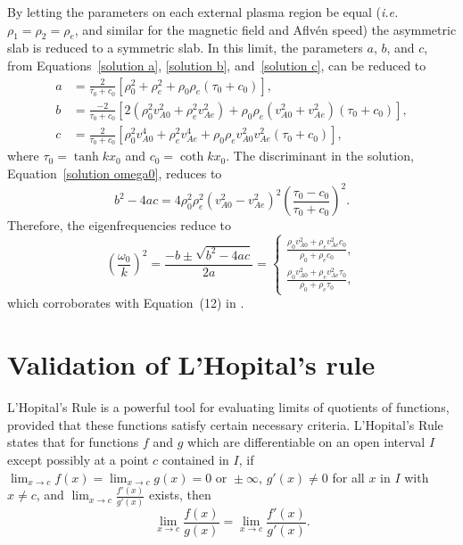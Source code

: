 \documentclass{aastex61}
\begin{document}
By letting the parameters on each external plasma region be equal (\textit{i.e.} $\rho_1 = \rho_2 = \rho_e$, and similar for the magnetic field and Aflv\'{e}n speed) the asymmetric slab is reduced to a symmetric slab. In this limit, the parameters $a$, $b$, and $c$, from Equations~\eqref{solution a}, \eqref{solution b}, and~\eqref{solution c}, can be reduced to
\begin{align}
a &= \frac{2}{\tau_0 + c_0} \left[ \rho_0^2 + \rho_e^2 + \rho_0\rho_e(\tau_0 + c_0) \right], \\
b &= \frac{-2}{\tau_0 + c_0} \left[ 2(\rho_0^2v_{A0}^2 + \rho_e^2v_{Ae}^2) + \rho_0\rho_e(v_{A0}^2 + v_{Ae}^2)(\tau_0 + c_0) \right], \\
c &= \frac{2}{\tau_0 + c_0} \left[ \rho_0^2v_{A0}^4 + \rho_e^2v_{Ae}^4 + \rho_0\rho_ev_{A0}^2v_{Ae}^2(\tau_0 + c_0) \right],
\end{align}
where $\tau_0 = \tanh{kx_0}$ and $c_0 = \coth{kx_0}$. The discriminant in the solution, Equation~\eqref{solution omega0}, reduces to
\begin{equation}
b^2 - 4ac = 4\rho_0^2\rho_e^2(v_{A0}^2 - v_{Ae}^2)^2 \left(\frac{\tau_0 - c_0}{\tau_0 + c_0}\right)^2. 
\end{equation}
Therefore, the eigenfrequencies reduce to
\begin{equation}
\left(\frac{\omega_0}{k}\right)^2 = \frac{-b \pm \sqrt{b^2 - 4ac}}{2a} =
\begin{cases}
\frac{\rho_0v_{A0}^2 + \rho_ev_{Ae}^2c_0}{\rho_0 + \rho_ec_0}, \\
\frac{\rho_0v_{A0}^2 + \rho_ev_{Ae}^2\tau_0}{\rho_0 + \rho_e\tau_0},
\end{cases}
\end{equation}
which corroborates with Equation~(12) in \cite{rob81b}.


\section{Validation of L'Hopital's rule} \label{app: l'hopital}
L'Hopital's Rule is a powerful tool for evaluating limits of quotients of functions, provided that these functions satisfy certain necessary criteria. L'Hopital's Rule states that for functions $f$ and $g$ which are differentiable on an open interval $I$ except possibly at a point $c$ contained in $I$, if $\lim_{x\to c}f(x) = \lim_{x\to c}g(x) = 0{\text{ or }}\pm \infty$, $g'(x) \neq 0$ for all $x$ in $I$ with $x \neq c$, and $\lim_{x\to c}\frac{f'(x)}{g'(x)}$ exists, then
\begin{equation}
\lim_{x\to c}\frac{f(x)}{g(x)} = \lim_{x\to c}\frac {f'(x)}{g'(x)}.
\end{equation}
\end{document}
